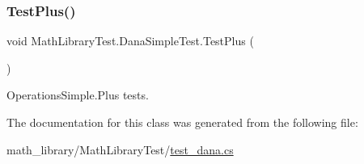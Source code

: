 \subsubsection{\texorpdfstring{Test\+Plus()}{TestPlus()}}
{\footnotesize\ttfamily void Math\+Library\+Test.\+Dana\+Simple\+Test.\+Test\+Plus (\begin{DoxyParamCaption}{ }\end{DoxyParamCaption})\hspace{0.3cm}{\ttfamily [inline]}}



Operations\+Simple.\+Plus tests. 



The documentation for this class was generated from the following file\+:\begin{DoxyCompactItemize}
\item 
math\+\_\+library/\+Math\+Library\+Test/\hyperlink{test__dana_8cs}{test\+\_\+dana.\+cs}\end{DoxyCompactItemize}
